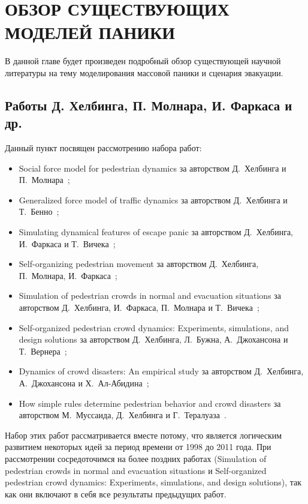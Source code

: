 \chapter{ОБЗОР СУЩЕСТВУЮЩИХ МОДЕЛЕЙ ПАНИКИ}
\label{sec:overview}

В данной главе будет произведен подробный обзор существующей научной литературы на тему моделирования массовой паники и сценария эвакуации.

\section{Работы Д. Хелбинга, П. Молнара, И. Фаркаса и др.}
\label{sub:overview:helbing}

Данный пункт посвящен рассмотрению набора работ:

\begin{itemize}
  \item Social force model for pedestrian dynamics за авторством Д.~Хелбинга и П.~Молнара~\cite{helbing_social_force};
  \item Generalized force model of traffic dynamics за авторством Д.~Хелбинга и Т.~Бенно~\cite{helbing1998generalized};
  \item Simulating dynamical features of escape panic за авторством Д.~Хелбинга, И.~Фаркаса и Т.~Вичека~\cite{helbing_escape_panic};
  \item Self-organizing pedestrian movement за авторством Д.~Хелбинга, П.~Молнара, И.~Фаркаса~\cite{helbing2001self};
  \item Simulation of pedestrian crowds in normal and evacuation situations за авторством Д.~Хелбинга, И.~Фаркаса, П.~Молнара и Т.~Вичека~\cite{helbing_evacuation};
  \item Self-organized pedestrian crowd dynamics: Experiments, simulations, and design solutions за авторством Д.~Хелбинга, Л.~Бужна, А.~Джохансона и Т.~Вернера~\cite{helbing2005self};
  \item Dynamics of crowd disasters: An empirical study за авторством Д.~Хелбинга, А.~Джохансона и Х.~Ал-Абидина~\cite{helbing2007dynamics};
  \item How simple rules determine pedestrian behavior and crowd disasters за авторством М.~Муссаида, Д.~Хелбинга и Г.~Тералуаза~\cite{moussaid2011simple}.
\end{itemize}

Набор этих работ рассматривается вместе потому, что является логическим развитием некоторых идей за период времени от 1998 до 2011 года.
При рассмотрении сосредоточимся на более поздних работах (Simulation of pedestrian crowds in normal and evacuation situations и Self-organized pedestrian crowd dynamics: Experiments, simulations, and design solutions), так как они включают в себя все результаты предыдущих работ.


